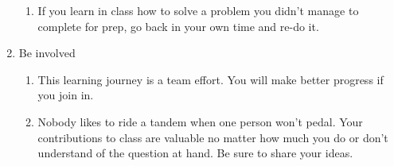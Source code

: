 \documentclass[class=exam, crop=false, 12pt]{standalone}
\begin{document}
\begin{enumerate}
\begin{enumerate}
\item If you learn in class how to solve a problem you didn't manage to complete for prep, go back in your own time and re-do it.
\end{enumerate}
\item Be involved
\begin{enumerate}
\item This learning journey is a team effort. You will make better progress if you join in.
\item Nobody likes to ride a tandem when one person won't pedal. Your contributions to class are valuable no matter how much you do or don't understand of the question at hand. Be sure to share your ideas.
\end{enumerate}
\end{enumerate}
\end{document}
